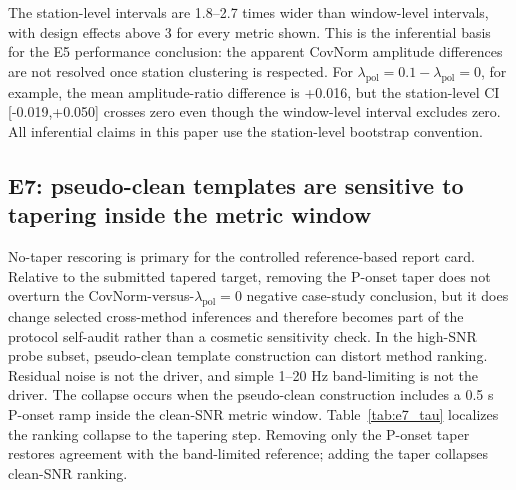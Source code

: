 \documentclass[review,12pt,authoryear]{elsarticle}
\newcommand{\lpol}{\lambda_{\mathrm{pol}}}
\begin{document}
\begin{table}[!htbp]
\centering
\caption{E6 no-taper window-level versus station-level paired-bootstrap calibration for CovNorm versus $\lpol=0$. Width ratio is station CI width divided by window CI width; ICC is the one-way intraclass correlation of paired case differences; DEFF is the corresponding design effect.}
\label{tab:e6_bootstrap}
\small
\resizebox{\linewidth}{!}{}
\end{table}

The station-level intervals are 1.8--2.7 times wider than window-level intervals, with design effects above 3 for every metric shown. This is the inferential basis for the E5 performance conclusion: the apparent CovNorm amplitude differences are not resolved once station clustering is respected. For $\lpol=0.1-\lpol=0$, for example, the mean amplitude-ratio difference is +0.016, but the station-level CI [-0.019,+0.050] crosses zero even though the window-level interval excludes zero. All inferential claims in this paper use the station-level bootstrap convention.

\FloatBarrier
\clearpage

\subsection{E7: pseudo-clean templates are sensitive to tapering inside the metric window}
\label{sec:e7}
No-taper rescoring is primary for the controlled reference-based report card. Relative to the submitted tapered target, removing the P-onset taper does not overturn the CovNorm-versus-$\lpol=0$ negative case-study conclusion, but it does change selected cross-method inferences and therefore becomes part of the protocol self-audit rather than a cosmetic sensitivity check. In the high-SNR probe subset, pseudo-clean template construction can distort method ranking. Residual noise is not the driver, and simple 1--20 Hz band-limiting is not the driver. The collapse occurs when the pseudo-clean construction includes a 0.5 s P-onset ramp inside the clean-SNR metric window.
Table~\ref{tab:e7_tau} localizes the ranking collapse to the tapering step. Removing only the P-onset taper restores agreement with the band-limited reference; adding the taper collapses clean-SNR ranking.
\end{document}
